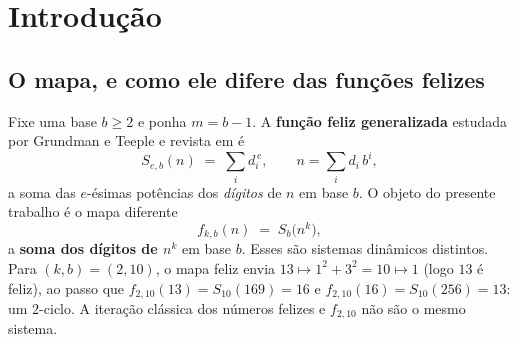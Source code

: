\documentclass[11pt]{article}
\theoremstyle{definition}
\theoremstyle{remark}
\begin{document}
\begin{abstract}
Os resultados (I) e (II) são consequências elementares da congruência da soma de dígitos (a ``prova dos noves'') e da equidistribuição de resíduos. A novidade reivindicada restringe-se à organização dessas consequências e ao isolamento do problema restante: como a massa $p_i$ se divide entre vários atratores físicos que compartilham uma assinatura. Essa partição não é elementar. Resolvo-a empírica e mecanicamente. As densidades de bacia individuais não parecem existir; ao longo de comprimento de dígitos fixo elas oscilam quase-periodicamente, em antifase entre atratores competidores, sempre somando $p_i$. Um modelo sem parâmetros, a lei gaussiana de $S_b(n^k)$ (teorema do limite local) na rede de imagem $v \equiv r^k \pmod{b-1}$, convoluída com a rotulação exata inteiro-para-atrator, reproduz a oscilação dentro do ruído de Monte Carlo (erro médio de ponte $|\delta_j-F_j| \approx 0{,}0017$ no piloto $(3,10)$ em $D=4\ldots 90$; \texttt{scripts/bridge\_check.py}). A oscilação é uma instância da clássica flutuação log-periódica de funções digitais (Delange; Drmota--Grabner).

Todas as afirmações são verificadas computacionalmente: uma varredura exaustiva de $19{,}500$ pares de parâmetros $(k,b)$ com $k \le 500$, $b \le 40$, com zero violações da cota inferior e com a forma inteira exata da lei agregada valendo sem exceção, acrescida de uma reimplementação independente relatada no Apêndice~A.

\smallskip
\noindent\emph{Errata.} Esta versão corrige cinco erros do rascunho de julho de 2026: uma afirmação falsa sobre a contagem de ciclos modulares, uma classificação errada de quais assinaturas oscilam, uma alegação exagerada de estreiteza para a cota de erro, uma estatística confundida, e uma rede de congruência errada no modelo gaussiano da divisão. Cada um está documentado no Apêndice~B, junto com o raciocínio que o produziu, pois os modos de falha são instrutivos.
\end{abstract}

\section{Introdução}

\subsection{O mapa, e como ele difere das funções felizes}

Fixe uma base $b \ge 2$ e ponha $m = b-1$. A \textbf{função feliz generalizada} estudada por Grundman e Teeple \cite{GT01,GT07} e revista em \cite{survey} é
\[
S_{e,b}(n) \;=\; \sum_i d_i^{\,e}, \qquad n = \sum_i d_i\, b^i,
\]
a soma das $e$-ésimas potências dos \emph{dígitos} de $n$ em base $b$. O objeto do presente trabalho é o mapa diferente
\[
f_{k,b}(n) \;=\; S_b\big(n^k\big),
\]
a \textbf{soma dos dígitos de $n^k$} em base $b$. Esses são sistemas dinâmicos distintos. Para $(k,b) = (2,10)$, o mapa feliz envia $13 \mapsto 1^2+3^2 = 10 \mapsto 1$ (logo $13$ é feliz), ao passo que $f_{2,10}(13) = S_{10}(169) = 16$ e $f_{2,10}(16) = S_{10}(256) = 13$: um $2$-ciclo. A iteração clássica dos números felizes e $f_{2,10}$ não são o mesmo sistema.
\end{document}
